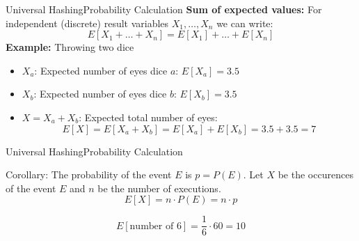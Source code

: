 
\begin{frame}{Universal Hashing}{Probability Calculation}
  \textbf{Sum of expected values:}
  For independent (discrete) result variables $X_1,\dots,X_n$ we can write:
    \[E\left[X_1+\dots+X_n\right]
      = E[X_1] + \dots + E[X_n]\]
  \textbf{Example:} Throwing two dice
  \begin{itemize}
    \item
      $X_a$: Expected number of eyes dice $a$: $E[X_a] = 3.5$
    \item
      $X_b$: Expected number of eyes dice $b$: $E[X_b] = 3.5$
    \item
      $X = X_a + X_b$: Expected total number of eyes:
      \[E[X]
        = E[X_a + X_b]
        = E[X_a] + E[X_b] = 3.5 + 3.5 = 7\]
  \end{itemize}
\end{frame}


\begin{frame}{Universal Hashing}{Probability Calculation}
  \begin{block}{Corollary:}
    The probability of the event $E$ is $p = P(E)$.
    Let $X$ be the occurences of the event $E$ and $n$ be the number
    of executions.
    \[E[X] = n \cdot P(E) = n \cdot p\]
  \end{block}
  \begin{example}
    \[E\left[\text{number of 6}\right] = \frac{1}{6} \cdot 60 = 10\]
  \end{example}
\end{frame}


